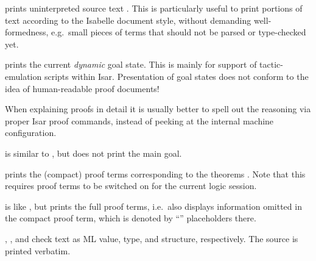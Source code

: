 \begin{isabellebody}
\begin{isamarkuptext}
\begin{description}
  \item {} prints uninterpreted source text .  This is particularly useful to print portions of text according
  to the Isabelle document style, without demanding well-formedness,
  e.g.\ small pieces of terms that should not be parsed or
  type-checked yet.

  \item {} prints the current \emph{dynamic} goal
  state.  This is mainly for support of tactic-emulation scripts
  within Isar.  Presentation of goal states does not conform to the
  idea of human-readable proof documents!

  When explaining proofs in detail it is usually better to spell out
  the reasoning via proper Isar proof commands, instead of peeking at
  the internal machine configuration.
  
  \item {} is similar to , but
  does not print the main goal.
  
  \item {} prints the (compact) proof terms
  corresponding to the theorems . Note that this
  requires proof terms to be switched on for the current logic
  session.
  
  \item {} is like , but prints the full proof terms, i.e.\ also displays
  information omitted in the compact proof term, which is denoted by
  ``\isa{{\isacharunderscore}}'' placeholders there.
  
  \item {}, , and  check text  as ML value, type, and
  structure, respectively.  The source is printed verbatim.


\end{description}
\end{isamarkuptext}
\end{isabellebody}
